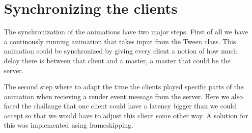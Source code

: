 \chapter{Synchronizing the clients}

The synchronization of the animations have two major steps. First of all we have a continously running animation that takes input from the Tween class. This animation could be synchronized by giving every client a notion of how much delay there is between that client and a master, a master that could be the server.

The second step where to adapt the time the clients played specific parts of the animation when recieving a render event message from the server. Here we also faced the challange that one client could have a latency bigger than we could accept so that we would have to adjust this client some other way. A solution for this was implemented using frameskipping. 



